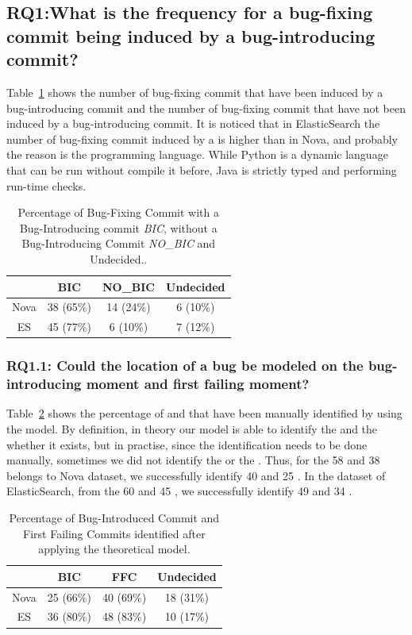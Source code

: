 \documentclass[a4paper, 12pt]{book}
\begin{document}
\subsection{ RQ1:What is the frequency for a bug-fixing commit being induced by a bug-introducing commit?}
Table~\ref{tableBugNoBug} shows the number of bug-fixing commit that have been induced by a bug-introducing commit and the number of bug-fixing commit that have not been induced by a bug-introducing commit. It is noticed that in ElasticSearch the number of bug-fixing commit induced by a \BIC is higher than in Nova, and probably the reason is the programming language. While Python is a dynamic language that can be run without compile it before, Java is strictly typed and performing run-time checks. 
\begin{table}[!t]
	\renewcommand{\arraystretch}{1.3}
	\caption{Percentage of Bug-Fixing Commit with a Bug-Introducing commit \emph{BIC}, without a Bug-Introducing Commit \emph{NO\_BIC} and Undecided..}
	\label{tableBugNoBug}
	\centering
	\begin{tabular}{|c|c|c|c| }
		\hline
  		&  BIC & NO\_BIC & Undecided \\
		\hline
		\hline
		Nova & 38 (65\%) & 14 (24\%) & 6 (10\%)\\
		\hline
		ES & 45 (77\%) &  6 (10\%) & 7 (12\%)\\
		\hline
	\end{tabular}
\end{table}

\subsubsection{RQ1.1: Could the location of a bug be modeled on the bug-introducing moment and first failing moment?}

Table~\ref{tableBICFFC} shows the percentage of \BIC and \FFC that have been manually identified by using the model. By definition, in theory our model is able to identify the \FFC and the \BIC whether it exists, but in practise, since the identification needs to be done manually, sometimes we did not identify the \BIC or the \FFC. Thus, for the 58 \FFC and 38 \BIC belongs to Nova dataset, we successfully identify 40 \FFC and 25 \BIC.
In the dataset of ElasticSearch, from the 60 \FFC and 45 \BIC, we successfully identify 49 \FFC and 34 \BIC.

\begin{table}[!t]
	\renewcommand{\arraystretch}{1.3}
	\caption{Percentage of Bug-Introduced Commit and First Failing Commits identified after applying the theoretical model.}
	\label{tableBICFFC}
	\centering
	\begin{tabular}{|c|c|c|c|}
		\hline
  		&  BIC & FFC & Undecided \\
		\hline
		\hline
		Nova & 25 (66\%) & 40 (69\%) & 18 (31\%)\\
		\hline
		ES & 36 (80\%) &  48 (83\%) & 10 (17\%)\\
		\hline
	\end{tabular}
\end{table}
\end{document}
